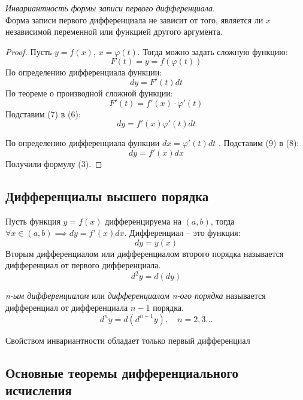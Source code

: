 \begin{theorem}
  \textit{Инвариантность формы записи первого дифференциала}. \\
  Форма записи первого дифференциала не зависит от того, является ли $x$ независимой переменной или функцией другого аргумента.
\end{theorem}
\begin{proof}
  Пусть $y = f(x)$,  $x = \varphi(t)$. Тогда можно задать сложную функцию: \[
  F(t) = y = f(\varphi(t))
  \] 
  По определению дифференциала функции: \[
    dy = F'(t)dt \tag{6}
  \] 
  По теореме о производной сложной функции: \[
    F'(t) = f'(x) \cdot \varphi'(t) \tag{7}
  \] 
  Подставим (7) в (6): \[
    dy = f'(x) \varphi'(t) dt \tag{8} 
  \] 

  По определению дифференциала функции $dx = \varphi'(t)dt$ .
  Подставим (9) в (8): \[
    \boxed{dy = f'(x) dx}
  \] 
  Получили формулу (3).
\end{proof}

\subsection{Дифференциалы высшего порядка}

Пусть функция $y = f(x)$ дифференцируема на $(a, b)$, тогда  $\forall x \in (a, b) \implies dy = f'(x)dx$. Дифференциал -- это функция: \[
    dy = y(x)
\] 
Вторым дифференциалом или дифференциалом второго порядка называется дифференциал от первого дифференциала. \[
  d^2y = d(dy)
\] 

\begin{definition}
  \textit{n-ым дифференциалом} или \textit{дифференциалом n-ого порядка} называется дифференциал от дифференциала $n-1$ порядка. \[
    d^ny = d\left(d^{n-1}y\right), \quad n = 2, 3\ldots
  \] 
\end{definition}

\begin{corollary}
  Свойством инвариантности обладает только первый дифференциал
\end{corollary}

\subsection{Основные теоремы дифференциального исчисления}

